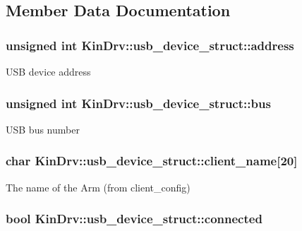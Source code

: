 \subsection{Member Data Documentation}
\hypertarget{structKinDrv_1_1usb__device__struct_a68e7077ad8819f255088238f9b1cd252}{
\subsubsection[{address}]{\setlength{\rightskip}{0pt plus 5cm}unsigned int Kin\+Drv\+::usb\+\_\+device\+\_\+struct\+::address}}\label{structKinDrv_1_1usb__device__struct_a68e7077ad8819f255088238f9b1cd252}
U\+S\+B device address \hypertarget{structKinDrv_1_1usb__device__struct_a0e6de35dc6c03706c83ace64c9febb37}{
\subsubsection[{bus}]{\setlength{\rightskip}{0pt plus 5cm}unsigned int Kin\+Drv\+::usb\+\_\+device\+\_\+struct\+::bus}}\label{structKinDrv_1_1usb__device__struct_a0e6de35dc6c03706c83ace64c9febb37}
U\+S\+B bus number \hypertarget{structKinDrv_1_1usb__device__struct_a03a9e83a8e46ac647654302ceafb2a5f}{
\subsubsection[{client\+\_\+name}]{\setlength{\rightskip}{0pt plus 5cm}char Kin\+Drv\+::usb\+\_\+device\+\_\+struct\+::client\+\_\+name\mbox{[}20\mbox{]}}}\label{structKinDrv_1_1usb__device__struct_a03a9e83a8e46ac647654302ceafb2a5f}
The name of the Arm (from client\+\_\+config) \hypertarget{structKinDrv_1_1usb__device__struct_a5edef24a9b1076404c9ab42410c82952}{
\subsubsection[{connected}]{\setlength{\rightskip}{0pt plus 5cm}bool Kin\+Drv\+::usb\+\_\+device\+\_\+struct\+::connected}}\label{structKinDrv_1_1usb__device__struct_a5edef24a9b1076404c9ab42410c82952}
